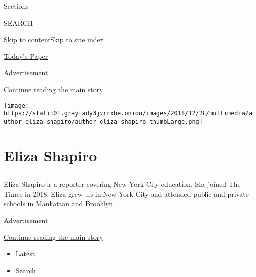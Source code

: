Sections

SEARCH

\protect\hyperlink{site-content}{Skip to
content}\protect\hyperlink{site-index}{Skip to site index}

\href{https://myaccount.nytimes3xbfgragh.onion/auth/login?response_type=cookie\&client_id=vi}{}

\href{https://www.nytimes3xbfgragh.onion/section/todayspaper}{Today's
Paper}

Advertisement

\protect\hyperlink{after-top}{Continue reading the main story}

\texttt{[image: https://static01.graylady3jvrrxbe.onion/images/2018/12/28/multimedia/author-eliza-shapiro/author-eliza-shapiro-thumbLarge.png]}

\hypertarget{eliza-shapiro}{%
\section{Eliza Shapiro}\label{eliza-shapiro}}

\hypertarget{section}{%
\subsection{}\label{section}}

Eliza Shapiro is a reporter covering New York City education. She joined
The Times in 2018. Eliza grew up in New York City and attended public
and private schools in Manhattan and Brooklyn.

Advertisement

\protect\hyperlink{after-mid1}{Continue reading the main story}

\begin{itemize}
\tightlist
\item
  \protect\hyperlink{stream-panel}{Latest}
\item
  Search
\end{itemize}

